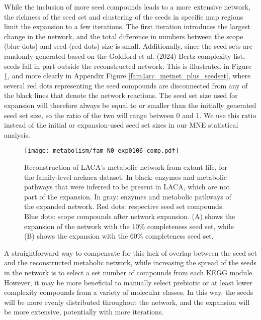 While the inclusion of more seed compounds leads to a more extensive network, the richness of the seed set and clustering of the seeds in specific map regions limit the expansion to a few iterations. The first iteration introduces the largest change in the network, and the total difference in numbers between the scope (blue dots) and seed (red dots) size is small. Additionally, since the seed sets are randomly generated based on the Goldford et al. (2024) \cite{goldford2024} Bertz complexity list, seeds fall in part outside the reconstructed network. This is illustrated in Figure \ref{fam4arc_metnetexp_0106}, and more clearly in Appendix Figure \ref{fam4arc_metnet_plus_seedset}, where several red dots representing the seed compounds are disconnected from any of the black lines that denote the network reactions. The seed set size used for expansion will therefore always be equal to or smaller than the initially generated seed set size, so the ratio of the two will range between 0 and 1. We use this ratio instead of the initial or expansion-used seed set sizes in our MNE statistical analysis.

\begin{figure}[H]
    \centering
    \texttt{[image: metabolism/fam\_N0\_exp0106\_comp.pdf]}
    \caption{Reconstruction of LACA's metabolic network from extant life, for the family-level archaea dataset. In black: enzymes and metabolic pathways that were inferred to be present in LACA, which are not part of the expansion. In gray: enzymes and metabolic pathways of the expanded network. Red dots: respective seed set compounds. Blue dots: scope compounds after network expansion. (A) shows the expansion of the network with the 10\% completeness seed set, while (B) shows the expansion with the 60\% completeness seed set.}    
    \label{fam4arc_metnetexp_0106}
\end{figure}

A straightforward way to compensate for this lack of overlap between the seed set and the reconstructed metabolic network, while increasing the spread of the seeds in the network is to select a set number of compounds from each KEGG module. However, it may be more beneficial to manually select prebiotic or at least lower complexity compounds from a variety of molecular classes. In this way, the seeds will be more evenly distributed throughout the network, and the expansion will be more extensive, potentially with more iterations.



